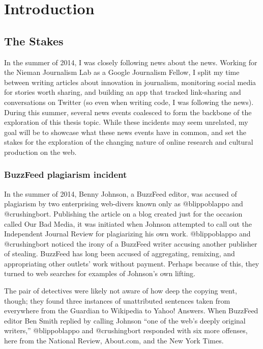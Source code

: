 \chapter{Introduction}

\section{The Stakes}

In the summer of 2014, I was closely following news about the news. Working for the Nieman Journalism Lab as a Google Journalism Fellow, I split my time between writing articles about innovation in journalism, monitoring social media for stories worth sharing, and building an app that tracked link-sharing and conversations on Twitter (so even when writing code, I was following the news). During this summer, several news events coalesced to form the backbone of the exploration of this thesis topic. While these incidents may seem unrelated, my goal will be to showcase what these news events have in common, and set the stakes for the exploration of the changing nature of online research and cultural production on the web.

\subsection{BuzzFeed plagiarism incident}

In the summer of 2014, Benny Johnson, a BuzzFeed editor, was accused of plagiarism by two enterprising web-divers known only as @blippoblappo and @crushingbort. Publishing the article on a blog created just for the occasion called Our Bad Media, it was initiated when Johnson attempted to call out the Independent Journal Review for plagiarizing his own work. @blippoblappo and @crushingbort noticed the irony of a BuzzFeed writer accusing another publisher of stealing. BuzzFeed has long been accused of aggregating, remixing, and appropriating other outlets' work without payment. Perhaps because of this, they turned to web searches for examples of Johnson's own lifting.

The pair of detectives were likely not aware of how deep the copying went, though; they found three instances of unattributed sentences taken from everywhere from the Guardian to Wikipedia to Yahoo! Answers. When BuzzFeed editor Ben Smith replied by calling Johnson ``one of the web's deeply original writers,'' @blippoblappo and @crushingbort responded with six more offenses, here from the National Review, About.com, and the New York Times.

